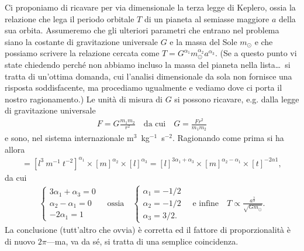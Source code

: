 \begin{examplebox}[htb]
  \begin{example}
    \label{exp:calcolo_dimensionale_keplero}
    Ci proponiamo di ricavare per via dimensionale la terza legge di Keplero,
    ossia la relazione che lega il periodo orbitale $T$ di un pianeta al
    semiasse maggiore $a$ della sua orbita. Assumeremo che gli ulteriori
    parametri che entrano nel problema siano la costante di gravitazione
    universale $G$ e la massa del Sole $m_\odot$ e che possiamo scrivere la
    relazione cercata come $T = G^{\alpha_1} m_\odot^{\alpha_2} a^{\alpha_3}$.
    (Se a questo punto vi state chiedendo perché non abbiamo incluso la
    massa del pianeta nella lista\ldots\ si tratta di un'ottima domanda, cui
    l'analisi dimensionale da sola non fornisce una risposta soddisfacente,
    ma procediamo ugualmente e vediamo dove ci porta il nostro ragionamento.)
    Le unità di misura di $G$ si possono ricavare, e.g. dalla legge di
    gravitazione universale
    \begin{align}
      F = G \frac{m_1 m_2}{r^2} \quad \text{da cui} \quad
      G = \frac{Fr^2}{m_1 m_2}
    \end{align}
    e sono, nel sistema internazionale m$^3$~kg$^{-1}$~s$^{-2}$. Ragionando come
    prima si ha allora
    \begin{align*}
      [t] = [l^3~m^{-1}~t^{-2}]^{\alpha_1} \times [m]^{\alpha_2} \times [l]^{\alpha_3} =
      [l]^{3\alpha_1 + \alpha_3} \times [m]^{\alpha_2 - \alpha_1} \times [t]^{-2\alpha1},
    \end{align*}
    da cui
     \begin{align}\label{eq:legge_di_keplero}
      \begin{cases}
        3\alpha_1 + \alpha_3 = 0\\
        \alpha_2 - \alpha_1 = 0\\
        -2\alpha_1 = 1
      \end{cases}
      \quad \text{ossia} \quad
      \begin{cases}
        \alpha_1 = -1/2\\
        \alpha_2 = -1/2\\
        \alpha_3 = 3/2.
      \end{cases}
      \quad \text{e infine} \quad
      T \propto \frac{a^{\frac{3}{2}}}{\sqrt{Gm_\odot}}.
     \end{align}
     La conclusione (tutt'altro che ovvia) è corretta ed il fattore di
     proporzionalità è di nuovo $2\pi$---ma, va da sé, si tratta di una
     semplice coincidenza.
  \end{example}
\end{examplebox}


